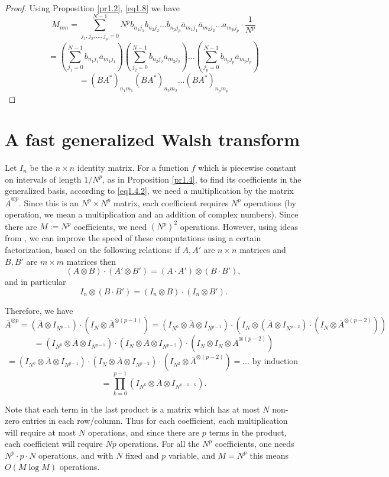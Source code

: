 \documentclass[11pt]{amsart}
\theoremstyle{definition}
\theoremstyle{remark}
\numberwithin{equation}{section}
\newcommand{\cj}[1]{\overline{#1}}
\begin{document}
\begin{proof}
Using Proposition \ref{pr1.2}, \eqref{eq1.8} we have
$$M_{nm}=\sum_{j_1,j_2,\dots,j_p=0}^{N-1}N^pb_{n_1j_1}b_{n_2j_2}\dots b_{n_pj_p}\cj a_{m_1j_1}\cj a_{m_2j_2}\dots a_{m_pj_p}\cdot\frac{1}{N^p}$$
$$=\left(\sum_{j_1=0}^{N-1}b_{n_1j_1}\cj a_{m_1j_1}\right)\left(\sum_{j_2=0}^{N-1}b_{n_2j_2}\cj a_{m_2j_2}\right)\dots\left(\sum_{j_p=0}^{N-1}b_{n_pj_p}\cj a_{m_pj_p}\right)$$$$=(BA^*)_{n_1m_1}(BA^*)_{n_2m_2}\dots (BA^*)_{n_pm_p}$$

\end{proof}

\section{A fast generalized Walsh transform}\label{fast}
Let $I_n$ be the $n\times n$ identity matrix. For a function $f$ which is piecewise constant on intervals of length $1/N^p$, as in Proposition \ref{pr1.4}, to find its coefficients in the generalized basis, according to \eqref{eq1.4.2}, we need a multiplication by the matrix $\cj A^{\otimes p}$. Since this is an $N^p\times N^p$ matrix, each coefficient requires $N^p$ operations (by operation, we mean a multiplication and an addition of complex numbers). Since there are $M:=N^p$ coefficients, we need $(N^p)^2$ operations. However, using ideas from \cite{LeKa86}, we can improve the speed of these computations using a certain factorization, based on the following relations: if $A,A'$ are $n\times n$ matrices and $B,B'$ are $m\times m$ matrices then
$$(A\otimes B)\cdot (A'\otimes B')=(A\cdot A')\otimes (B\cdot B'),$$
and in particular
$$I_n\otimes (B\cdot B')=(I_n\otimes B)\cdot (I_n\otimes B').$$

Therefore, we have
$$\cj A^{\otimes p}=(\cj A\otimes I_{N^{p-1}})\cdot (I_N\otimes \cj A^{\otimes (p-1)})=(I_{N^0}\otimes \cj A\otimes I_{N^{p-1}})\cdot (I_N\otimes  (\cj A\otimes I_{N^{p-2}})\cdot (I_N\otimes\cj A^{\otimes (p-2)}))$$
$$=(I_{N^0}\otimes \cj A\otimes I_{N^{p-1}})\cdot (I_N\otimes\cj A\otimes I_{N^{p-2}})\cdot (I_N\otimes I_N\otimes \cj A^{\otimes (p-2)})$$$$=(I_{N^0}\otimes \cj A\otimes I_{N^{p-1}})\cdot (I_N\otimes\cj A\otimes I_{N^{p-2}})\cdot (I_{N^2}\otimes \cj A^{\otimes (p-2)})=\dots \mbox{ by induction }$$$$=\prod_{k=0}^{p-1}(I_{N^k}\otimes \cj A\otimes I_{N^{p-1-k}}).$$

Note that each term in the last product is a matrix which has at most $N$ non-zero entries in each row/column. Thus for each coefficient, each multiplication will require at most $N$ operations, and since there are $p$ terms in the product, each coefficient will require $Np$ operations. For all the $N^p$ coefficients, one needs $N^p\cdot p\cdot N$ operations, and with $N$ fixed and $p$ variable, and $M=N^p$ this means $O(M\log M)$ operations.
\end{document}
